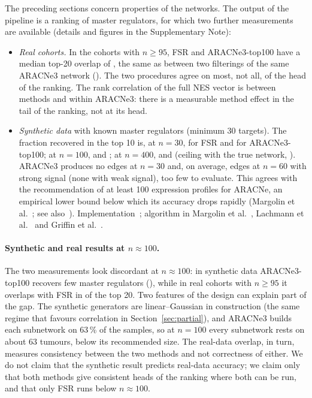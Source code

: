 \documentclass[11pt,a4paper]{article}
\theoremstyle{plain}
\theoremstyle{remark}
\newcommand{\FSR}{FSR}
\begin{document}
The preceding sections concern properties of the networks. The output of the pipeline is a
ranking of master regulators, for which two further measurements are available (details and figures
in the Supplementary Note):
\begin{itemize}
  \item \emph{Real cohorts.} In the \KAvsBnaracneThree{} cohorts with $n\ge95$, \FSR{} and ARACNe3-top100 have a median top-20 overlap of
  \KAvsBmediantopTwoZero{}, the same as between two filterings of the same ARACNe3 network (\KBvsCmediantopTwoZero). The two procedures
  agree on most, not all, of the head of the ranking. The rank correlation of the full NES vector is \KAvsBmedianrho{} between methods and \KBvsCmedianrho{} within
  ARACNe3: there is a measurable method effect in the tail of the ranking, not at its head.
  \item \emph{Synthetic data} with known master regulators (minimum 30 targets). The fraction recovered in the top 10 is, at $n=30$,
  \KsynstrongmtThreeZeroAkOneZeroZeronThreeZeroprecOneZero{} for \FSR{} and
  \KsynstrongmtThreeZeroBkOneZeroZeronThreeZeroprecOneZero{} for ARACNe3-top100; at $n=100$,
  \KsynstrongmtThreeZeroAkOneZeroZeronOneZeroZeroprecOneZero{} and
  \KsynstrongmtThreeZeroBkOneZeroZeronOneZeroZeroprecOneZero; at $n=400$,
  \KsynstrongmtThreeZeroAkOneZeroZeronFourZeroZeroprecOneZero{} and
  \KsynstrongmtThreeZeroBkOneZeroZeronFourZeroZeroprecOneZero{} (ceiling with the true network,
  \KsynstrongmtThreeZerotruthnFourZeroZeroprecOneZero). ARACNe3 produces no edges at
  $n=30$ and, on average, \KsynstrongaracneThreefullnSixZeronedges{} edges at $n=60$ with strong signal (none with weak signal), too few to
  evaluate. This agrees with the recommendation of at least 100 expression profiles for ARACNe, an empirical lower bound below which
  its accuracy drops rapidly (Margolin et al.~\cite{margolin2006protocols}; see also~\cite{margolin2006,ding2018}). Implementation~\cite{aracne3}; algorithm in Margolin et al.~\cite{margolin2006},
  Lachmann et al.~\cite{lachmann2016} and Griffin et al.~\cite{griffin2023}.
\end{itemize}
\paragraph{Synthetic and real results at $n\approx100$.} The two measurements look discordant at $n\approx100$: in synthetic data
ARACNe3-top100 recovers few master regulators (\KsynstrongmtThreeZeroBkOneZeroZeronOneZeroZeroprecOneZero), while in real cohorts with $n\ge95$ it
overlaps with \FSR{} in \KAvsBmediantopTwoZero{} of the top 20. Two features of the design can explain part of the gap. The synthetic generators are
linear--Gaussian in construction (the same regime that favours correlation in Section~\ref{sec:partial}), and ARACNe3 builds each subnetwork
on 63\,\% of the samples, so at $n=100$ every subnetwork rests on about 63 tumours, below its recommended size. The real-data overlap, in turn, measures consistency between the two methods and not
correctness of either. We do not claim that the synthetic result predicts real-data accuracy; we claim only that both methods give consistent heads of the ranking where both can be run, and that only
\FSR{} runs below $n\approx100$.
\end{document}
